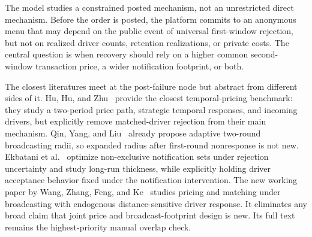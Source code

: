 \documentclass[11pt]{article}
\theoremstyle{definition}
\theoremstyle{remark}
\begin{document}
The model studies a constrained posted mechanism, not an unrestricted direct
mechanism.  Before the order is posted, the platform commits to an anonymous
menu that may depend on the public event of universal first-window rejection,
but not on realized driver counts, retention realizations, or private costs.
The central question is when recovery should rely on a higher common second-
window transaction price, a wider notification footprint, or both.

The closest literatures meet at the post-failure node but abstract from
different sides of it.  Hu, Hu, and Zhu~\cite{HuHuZhu2022} provide the closest
temporal-pricing benchmark: they study a two-period price path, strategic
temporal responses, and incoming drivers, but explicitly remove matched-driver
rejection from their main mechanism.  Qin, Yang, and Liu~\cite{QinYangLiu2025}
already propose adaptive two-round broadcasting radii, so expanded radius
after first-round nonresponse is not new.  Ekbatani et al.~\cite{LyftI2026,LyftII2026}
optimize non-exclusive notification sets under rejection uncertainty and
study long-run thickness, while explicitly holding driver acceptance behavior
fixed under the notification intervention.  The new working paper by Wang,
Zhang, Feng, and Ke~\cite{WangZhangFengKe2026} studies pricing and matching
under broadcasting with endogenous distance-sensitive driver response.  It
eliminates any broad claim that joint price and broadcast-footprint design is
new.  Its full text remains the highest-priority manual overlap check.
\end{document}
